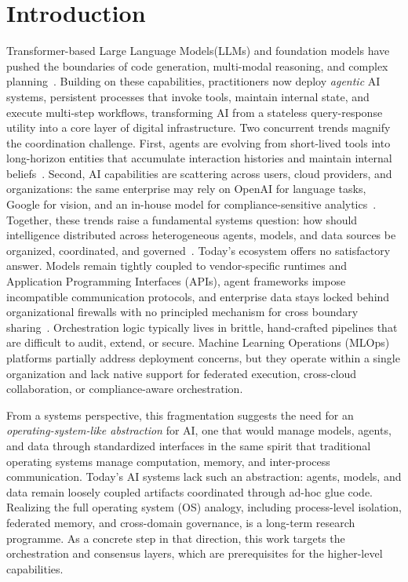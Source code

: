 \documentclass{iopjournal}
\begin{document}
\section{Introduction}\label{sec:intro}
Transformer-based Large Language Models(LLMs) and foundation models have pushed the boundaries of code generation, multi-modal reasoning, and complex planning~\cite{Kotei, chen2024evolution}. Building on these capabilities, practitioners now deploy \emph{agentic} AI systems, persistent processes that invoke tools, maintain internal state, and execute multi-step workflows, transforming AI from a stateless query-response utility into a core layer of digital infrastructure. Two concurrent trends magnify the coordination challenge. First, agents are evolving from short-lived tools into long-horizon entities that accumulate interaction histories and maintain internal beliefs~\cite{Liu}. Second, AI capabilities are scattering across users, cloud providers, and organizations: the same enterprise may rely on OpenAI for language tasks, Google for vision, and an in-house model for compliance-sensitive analytics~\cite{Davenport}. Together, these trends raise a fundamental systems question: how should intelligence distributed across heterogeneous agents, models, and data sources be organized, coordinated, and governed~\cite{zhu2023intelligent}. Today's ecosystem offers no satisfactory answer. Models remain tightly coupled to vendor-specific runtimes and Application Programming Interfaces (APIs), agent frameworks impose incompatible communication protocols, and enterprise data stays locked behind organizational firewalls with no principled mechanism for cross boundary sharing~\cite{REALM}. Orchestration logic typically lives in brittle, hand-crafted pipelines that are difficult to audit, extend, or secure. Machine Learning Operations (MLOps) platforms partially address deployment concerns, but they operate within a single organization and lack native support for federated execution, cross-cloud collaboration, or compliance-aware orchestration.

From a systems perspective, this fragmentation suggests the need for an \emph{operating-system-like abstraction} for AI, one that would manage models, agents, and data through standardized interfaces in the same spirit that traditional operating systems manage computation, memory, and inter-process communication. Today's AI systems lack such an abstraction: agents, models, and data remain loosely coupled artifacts coordinated through ad-hoc glue code. Realizing the full operating system (OS) analogy, including process-level isolation, federated memory, and cross-domain governance, is a long-term research programme. As a concrete step in that direction, this work targets the orchestration and consensus layers, which are prerequisites for the higher-level capabilities.
\end{document}
